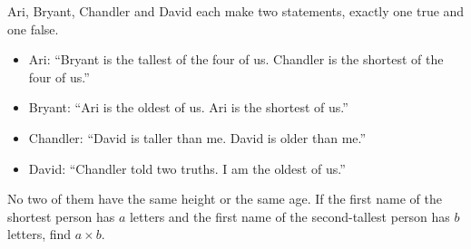 Ari, Bryant, Chandler and David each make two statements, exactly one true and one false.
\begin{itemize}
\item Ari: ``Bryant is the tallest of the four of us. Chandler is the shortest of the four of us.''
\item Bryant: ``Ari is the oldest of us. Ari is the shortest of us.''
\item Chandler: ``David is taller than me. David is older than me.''
\item David: ``Chandler told two truths. I am the oldest of us.''
\end{itemize}
No two of them have the same height or the same age. If the first name of the shortest person has $a$ letters and the first name of the second-tallest person has $b$ letters, find $a\times b$.
